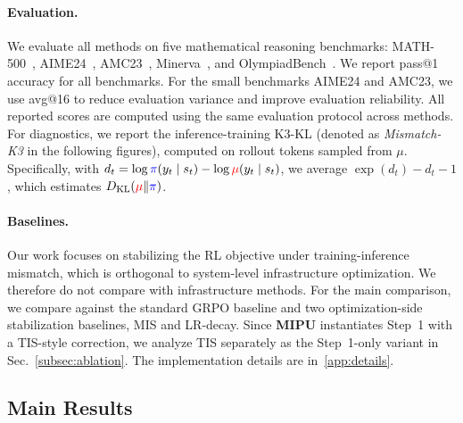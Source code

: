 \paragraph{Evaluation.}
We evaluate all methods on five mathematical reasoning benchmarks: MATH-500~\citep{hendrycksmath2021}, AIME24~\citep{AIME24}, AMC23~\citep{AMC23}, Minerva~\citep{minerva}, and OlympiadBench~\citep{olympiadbench}.
We report pass@1 accuracy for all benchmarks.
For the small benchmarks AIME24 and AMC23, we use avg@16 to reduce evaluation variance and improve evaluation reliability.
All reported scores are computed using the same evaluation protocol across methods. 
For diagnostics, we report the inference-training K3-KL (denoted as \textit{Mismatch-K3} in the following figures), computed on rollout tokens sampled from $\mu$. 
Specifically, with $d_t=\log \textcolor{blue}{\pi}(y_t\mid s_t)-\log \textcolor{red}{\mu}(y_t\mid s_t)$, we average $\exp(d_t)-d_t-1$, which estimates $D_{\mathrm{KL}}(\textcolor{red}{\mu}\|\textcolor{blue}{\pi})$.

\paragraph{Baselines.}
Our work focuses on stabilizing the RL objective under training-inference mismatch, which is orthogonal to system-level infrastructure optimization.
We therefore do not compare with infrastructure methods.
For the main comparison, we compare against the standard GRPO baseline and two optimization-side stabilization baselines, MIS and LR-decay.
Since \textbf{MIPU} instantiates Step~1 with a TIS-style correction, we analyze TIS separately as the Step~1-only variant in Sec.~\ref{subsec:ablation}.
The implementation details are in~\autoref{app:details}.

\subsection{Main Results}
\label{subsec:main-res}





